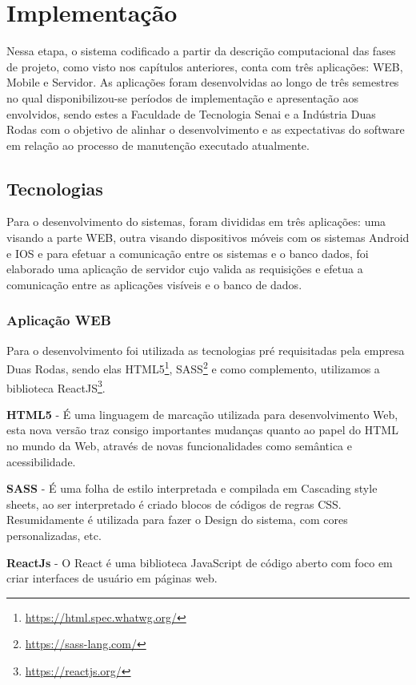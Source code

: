 \chapter{Implementação}

Nessa etapa, o sistema codificado a partir da descrição computacional das fases de projeto, como visto nos capítulos anteriores, conta com três aplicações: WEB, Mobile e Servidor. As aplicações foram desenvolvidas ao longo de três semestres no qual disponibilizou-se períodos de implementação e apresentação aos envolvidos, sendo estes a Faculdade de Tecnologia Senai e a Indústria Duas Rodas com o objetivo de alinhar o desenvolvimento e as expectativas do software em relação ao processo de manutenção executado atualmente.

\section{Tecnologias}
Para o desenvolvimento do sistemas, foram divididas em três aplicações: uma visando a parte WEB, outra visando dispositivos móveis com os sistemas Android e IOS e para efetuar a comunicação entre os sistemas e o banco dados, foi elaborado uma aplicação de servidor cujo valida as requisições e efetua a comunicação entre as aplicações visíveis e o banco de dados.

\subsection{Aplicação WEB}

Para o desenvolvimento foi utilizada as tecnologias pré requisitadas pela empresa Duas Rodas, sendo elas HTML5\footnote{\url{https://html.spec.whatwg.org/}}, SASS\footnote{\url{https://sass-lang.com/}} e como complemento, utilizamos a biblioteca ReactJS\footnote{\url{https://reactjs.org/}}.

{\textbf{HTML5} - É uma linguagem de marcação utilizada para desenvolvimento Web, esta nova versão traz consigo importantes mudanças quanto ao papel do HTML no mundo da Web, através de novas funcionalidades como semântica e acessibilidade.}

{\textbf{SASS} - É uma folha de estilo interpretada e compilada em Cascading style sheets, ao ser interpretado é criado blocos de códigos de regras CSS. Resumidamente é utilizada para fazer o Design do sistema, com cores personalizadas, etc.}

{\textbf{ReactJs} - O React é uma biblioteca JavaScript de código aberto com foco em criar interfaces de usuário em páginas web.}


